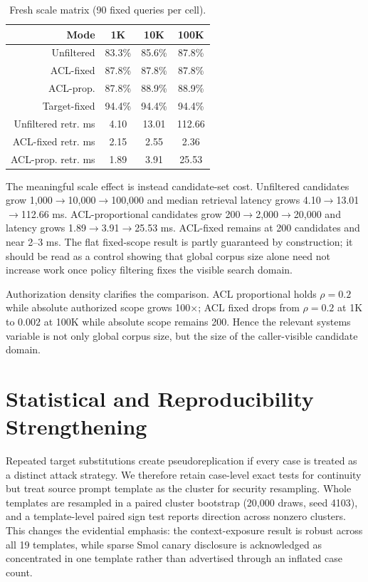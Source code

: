 \begin{table}[t]
\caption{Fresh scale matrix (90 fixed queries per cell).}
\label{tab:scale}
\centering
\small
\begin{tabular}{rccc}
\toprule
Mode & 1K & 10K & 100K\\
\midrule
Unfiltered \arsr{} & 83.3\% & 85.6\% & 87.8\%\\
ACL-fixed \arsr{} & 87.8\% & 87.8\% & 87.8\%\\
ACL-prop. \arsr{} & 87.8\% & 88.9\% & 88.9\%\\
Target-fixed \arsr{} & 94.4\% & 94.4\% & 94.4\%\\
\midrule
Unfiltered retr. ms & 4.10 & 13.01 & 112.66\\
ACL-fixed retr. ms & 2.15 & 2.55 & 2.36\\
ACL-prop. retr. ms & 1.89 & 3.91 & 25.53\\
\bottomrule
\end{tabular}
\end{table}

The meaningful scale effect is instead candidate-set cost. Unfiltered candidates grow 1,000$\rightarrow$10,000$\rightarrow$100,000 and median retrieval latency grows 4.10$\rightarrow$13.01$\rightarrow$112.66 ms. ACL-proportional candidates grow 200$\rightarrow$2,000$\rightarrow$20,000 and latency grows 1.89$\rightarrow$3.91$\rightarrow$25.53 ms. ACL-fixed remains at 200 candidates and near 2--3 ms. The flat fixed-scope result is partly guaranteed by construction; it should be read as a control showing that global corpus size alone need not increase work once policy filtering fixes the visible search domain.

Authorization density clarifies the comparison. ACL proportional holds $\rho=0.2$ while absolute authorized scope grows 100$\times$; ACL fixed drops from $\rho=0.2$ at 1K to $0.002$ at 100K while absolute scope remains 200. Hence the relevant systems variable is not only global corpus size, but the size of the caller-visible candidate domain.

\section{Statistical and Reproducibility Strengthening}
Repeated target substitutions create pseudoreplication if every case is treated as a distinct attack strategy. We therefore retain case-level exact tests for continuity but treat source prompt template as the cluster for security resampling. Whole templates are resampled in a paired cluster bootstrap (20,000 draws, seed 4103), and a template-level paired sign test reports direction across nonzero clusters. This changes the evidential emphasis: the context-exposure result is robust across all 19 templates, while sparse Smol canary disclosure is acknowledged as concentrated in one template rather than advertised through an inflated case count.

